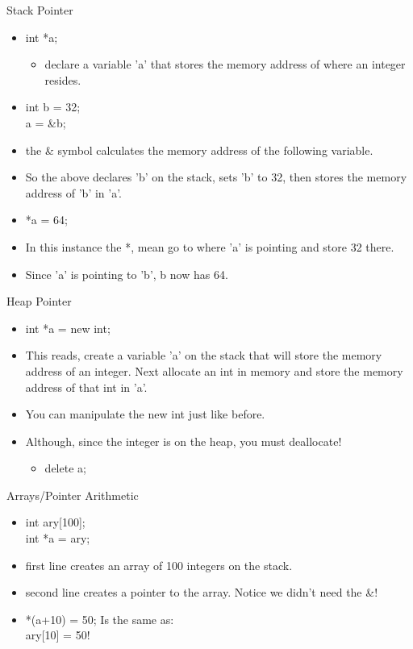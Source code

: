 \documentclass{beamer}
\begin{document}
\begin{frame}{Stack Pointer}
\begin{itemize}
\item int *a;
\begin{itemize}
\item declare a variable 'a' that stores the memory address of where an integer resides.
\end{itemize}
\item int b = 32; \\
a = \&b;
\item the \& symbol calculates the memory address of the following variable.
\item So the above declares 'b' on the stack, sets 'b' to 32, then stores the memory address of 'b' in 'a'.
\item *a = 64;
\item In this instance the *, mean go to where 'a' is pointing and store 32 there.
\item Since 'a' is pointing to 'b', b now has 64.
\end{itemize}
\end{frame}

\begin{frame}{Heap Pointer}
\begin{itemize}
\item int *a = new int;
\item This reads, create a variable 'a' on the stack that will store the memory address of an integer.  Next allocate an int in memory and store the memory address of that int in 'a'.
\item You can manipulate the new int just like before.
\item Although, since the integer is on the heap, you must deallocate!
\begin{itemize}
\item delete a;
\end{itemize}
\end{itemize}
\end{frame}

\begin{frame}{Arrays/Pointer Arithmetic}
\begin{itemize}
\item int ary[100];\\
int *a = ary;
\item first line creates an array of 100 integers on the stack.
\item second line creates a pointer to the array.  Notice we didn't need the \&!
\item *(a+10) = 50; Is the same as:\\
ary[10] = 50!
\end{itemize}
\end{frame}
\end{document}
